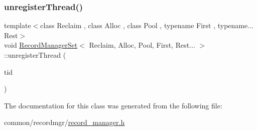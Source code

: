 \mbox{\label{classRecordManagerSet_3_01Reclaim_00_01Alloc_00_01Pool_00_01First_00_01Rest_8_8_8_01_4_ace148ff49e1acd8ffe3fde0642ab2c9a}} 
\subsubsection{\texorpdfstring{unregister\+Thread()}{unregisterThread()}}
{\footnotesize\ttfamily template$<$class Reclaim , class Alloc , class Pool , typename First , typename... Rest$>$ \\
void \hyperlink{classRecordManagerSet}{Record\+Manager\+Set}$<$ Reclaim, Alloc, Pool, First, Rest... $>$\+::unregister\+Thread (\begin{DoxyParamCaption}\item[{const int}]{tid }\end{DoxyParamCaption})\hspace{0.3cm}{\ttfamily [inline]}}



The documentation for this class was generated from the following file\+:\begin{DoxyCompactItemize}
\item 
common/recordmgr/\hyperlink{record__manager_8h}{record\+\_\+manager.\+h}\end{DoxyCompactItemize}
